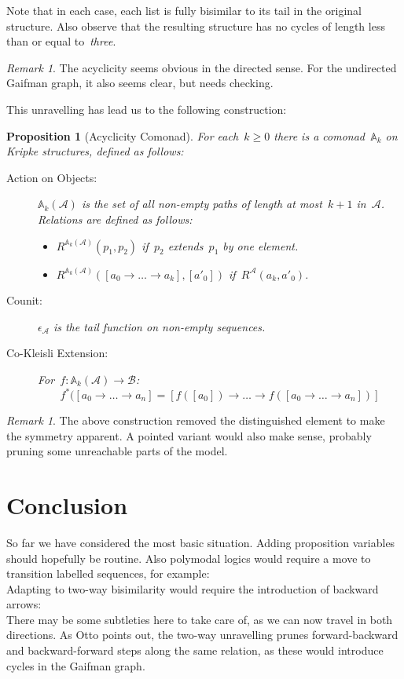 \documentclass{article}
\theoremstyle{plain}
\newtheorem{proposition}[theorem]{Proposition}
\theoremstyle{definition}
\theoremstyle{remark}
\newtheorem{remark}[theorem]{Remark}
\numberwithin{theorem}{section}
\newcommand{\As}{\mathcal{A}}
\newcommand{\Bs}{\mathcal{B}}
\newcommand{\A}{\mathbb{A}}
\newcommand{\Ak}{\A_{k}}
\begin{document}
Note that in each case, each list is fully bisimilar to its tail in the original structure. Also observe that the resulting structure has no cycles of length less than or equal to~\emph{three}.
\begin{remark}
The acyclicity seems obvious in the directed sense. For the undirected Gaifman graph, it also seems clear, but needs checking.
\end{remark}
This unravelling has lead us to the following construction:
\begin{proposition}[Acyclicity Comonad]
For each~$k \geq 0$ there is a comonad~$\Ak$ on Kripke structures, defined as follows:
\begin{description}
\item[Action on Objects:] $\Ak(\As)$ is the set of all non-empty paths of length at most~$k + 1$ in~$\As$. Relations are defined as follows:
\begin{itemize}
    \item $R^{\Ak(\As)}(p_1,p_2)$ if~$p_2$ extends~$p_1$ by one element.
    \item $R^{\Ak(\As)}([a_0 \rightarrow \ldots \rightarrow a_k], [a'_0])$ if~$R^{\As}(a_k, a'_0)$.
\end{itemize}
\item[Counit:] $\epsilon_{\As}$ is the tail function on non-empty sequences.
\item[Co-Kleisli Extension:] For~$f : \Ak(\As) \rightarrow \Bs$:
\begin{equation*}
    f^*([a_0 \rightarrow \ldots \rightarrow a_n] = [f([a_0]) \rightarrow \ldots \rightarrow f([a_0 \rightarrow \ldots \rightarrow a_n])]
\end{equation*}
\end{description}
\end{proposition}
\begin{remark}
The above construction removed the distinguished element to make the symmetry apparent. A pointed variant would also make sense, probably pruning some unreachable parts of the model.
\end{remark}

\section{Conclusion}
So far we have considered the most basic situation. Adding proposition variables should hopefully be routine. Also polymodal logics would require a move to transition labelled sequences, for example:
\begin{equation*}
    [a_0 \xrightarrow{\alpha} a_1 \xrightarrow{\beta} a_2]
\end{equation*}
Adapting to two-way bisimilarity would require the introduction of backward arrows:
\begin{equation*}
    [a_0 \xrightarrow{\alpha} a_1 \xleftarrow{\beta} a_2]
\end{equation*}
There may be some subtleties here to take care of, as we can now travel in both directions. As Otto points out, the two-way unravelling prunes forward-backward and backward-forward steps along the same relation, as these would introduce cycles in the Gaifman graph. 
\end{document}

